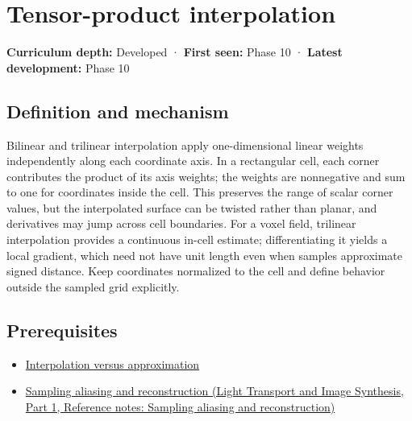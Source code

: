 \hypertarget{appendix-0a09b6dfdc86}{}\label{referencestart:appendix-0a09b6dfdc86}
\section{Tensor-product interpolation}\label{appendix-0a09b6dfdc86-tensor-product-interpolation}

\hypertarget{appendix-0a09b6dfdc86-tensor-product-interpolation}{}

\textbf{Curriculum depth:} Developed · \textbf{First seen:} Phase 10 · \textbf{Latest development:} Phase 10

\begin{allmightroledefinition}

\subsection{Definition and mechanism}\label{appendix-0a09b6dfdc86-definition-and-mechanism}

\hypertarget{appendix-0a09b6dfdc86-definition-and-mechanism}{}

Bilinear and trilinear interpolation apply one-dimensional linear weights independently along each coordinate axis. In a rectangular cell, each corner contributes the product of its axis weights; the weights are nonnegative and sum to one for coordinates inside the cell. This preserves the range of scalar corner values, but the interpolated surface can be twisted rather than planar, and derivatives may jump across cell boundaries. For a voxel field, trilinear interpolation provides a continuous in-cell estimate; differentiating it yields a local gradient, which need not have unit length even when samples approximate signed distance. Keep coordinates normalized to the cell and define behavior outside the sampled grid explicitly.

\end{allmightroledefinition}

\subsection{Prerequisites}\label{appendix-0a09b6dfdc86-prerequisites}

\hypertarget{appendix-0a09b6dfdc86-prerequisites}{}

\begin{itemize}
\tightlist
\item
  \hyperref[appendix-0c2a5f69851e]{Interpolation versus approximation}
\item
  \href{../04-Light-Transport-and-Image-Synthesis-P01/main.pdf\#appendix-6a7869dd79a6}{Sampling aliasing and reconstruction (Light Transport and Image Synthesis, Part 1, Reference notes: Sampling aliasing and reconstruction)}
\end{itemize}

